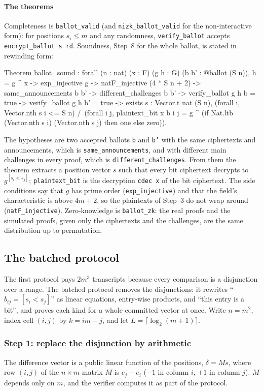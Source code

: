 \documentclass[11pt,a4paper]{article}
\newcommand{\rocq}[1]{\texttt{#1}}
\theoremstyle{remark}
\begin{document}
\paragraph{The theorems} Completeness is \rocq{ballot\_valid} (and
\rocq{nizk\_ballot\_valid} for the non-interactive form): for positions
$s_i \le m$ and any randomness, \rocq{verify\_ballot} accepts
\rocq{encrypt\_ballot s rd}. Soundness, Step~8 for the whole ballot, is
stated in rewinding form:
\begin{coq}
Theorem ballot_sound : forall (n : nat) (x : F) (g h : G) (b b' : @ballot (S n)),
  h = g ^ x -> exp_injective g -> natF_injective (4 * S n + 2) ->
  same_announcements b b' -> different_challenges b b' ->
  verify_ballot g h b = true -> verify_ballot g h b' = true ->
  exists s : Vector.t nat (S n),
    (forall i, Vector.nth s i <= S n) /\
    (forall i j, plaintext_bit x b i j =
      g ^ (if Nat.ltb (Vector.nth s i) (Vector.nth s j) then one else zero)).
\end{coq}
The hypotheses are two accepted ballots \rocq{b} and \rocq{b'} with the
same ciphertexts and announcements, which is \rocq{same\_announcements},
and with different main challenges in every proof, which is
\rocq{different\_challenges}. From them the theorem
extracts a position vector $s$ such that every bit ciphertext decrypts
to $g^{[s_i < s_j]}$; \rocq{plaintext\_bit} is the decryption
\rocq{cdec x} of the bit ciphertext. The side conditions say that $g$ has prime order
(\rocq{exp\_injective}) and that the field's characteristic is above
$4m + 2$, so the plaintexts of Step~3 do not wrap around
(\rocq{natF\_injective}). Zero-knowledge is \rocq{ballot\_zk}: the real
proofs and the simulated proofs, given only the ciphertexts and the
challenges, are the same distribution up to permutation.

\subsection{The batched protocol}
The first protocol pays $2m^3$ transcripts because every comparison is a
disjunction over a range. The batched protocol removes the disjunctions:
it rewrites ``$b_{ij} = [s_i < s_j]$'' as linear equations, entry-wise
products, and ``this entry is a bit'', and proves each kind for a whole
committed vector at once. Write $n = m^2$, index cell $(i, j)$ by $k = im
+ j$, and let $L = \lceil \log_2(m + 1) \rceil$.

\subsubsection*{Step 1: replace the disjunction by arithmetic}
The difference vector is a public linear function of the positions,
$\delta = Ms$, where row $(i, j)$ of the $n \times m$ matrix $M$ is $e_j -
e_i$ ($-1$ in column $i$, $+1$ in column $j$). $M$ depends only on $m$,
and the verifier computes it as part of the protocol.
\end{document}
